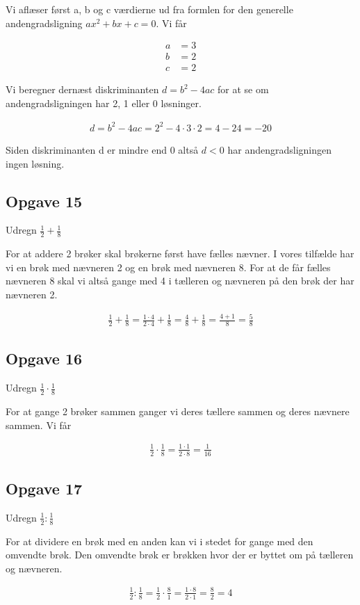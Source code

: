 Vi aflæser først a, b og c værdierne ud fra formlen for den generelle andengradsligning $ax^2 +bx +c =0$.
Vi får

\begin{align*}
a&=3\\
b&=2\\
c&=2
\end{align*}

Vi beregner dernæst diskriminanten $d = b^2 - 4ac$ for at se om andengradsligningen har 2, 1 eller 0 løsninger.

\begin{align*}
d = b^2 -4ac = 2^2 -4\cdot 3\cdot 2 = 4 - 24 = -20
\end{align*}

Siden diskriminanten d er mindre end 0 altså $d<0$ har andengradsligningen ingen løsning. 

\subsection{Opgave 15}
Udregn $\frac{1}{2} + \frac{1}{8}$

For at addere 2 brøker skal brøkerne først have fælles nævner. I vores tilfælde har vi en brøk med nævneren 2 og en brøk med nævneren 8. For at de får fælles nævneren 8 skal vi altså gange med 4 i tælleren og nævneren på den brøk der har nævneren 2.

\begin{align*}
\frac{1}{2} + \frac{1}{8} = \frac{1\cdot 4}{2\cdot 4} + \frac{1}{8} = \frac{4}{8} + \frac{1}{8} = \frac{4+1}{8} = \frac{5}{8}
\end{align*}

\subsection{Opgave 16}
Udregn $\frac{1}{2}\cdot \frac{1}{8}$

For at gange 2 brøker sammen ganger vi deres tællere sammen og deres nævnere sammen. Vi får

\begin{align*}
\frac{1}{2}\cdot \frac{1}{8} = \frac{1\cdot 1}{2\cdot 8} = \frac{1}{16}
\end{align*}

\subsection{Opgave 17}
Udregn $\frac{1}{2}:\frac{1}{8}$

For at dividere en brøk med en anden kan vi i stedet for gange med den omvendte brøk. Den omvendte brøk er brøkken hvor der er byttet om på tælleren og nævneren.

\begin{align*}
\frac{1}{2}:\frac{1}{8} = \frac{1}{2}\cdot \frac{8}{1} = \frac{1\cdot 8}{2\cdot 1} = \frac{8}{2} = 4
\end{align*}
